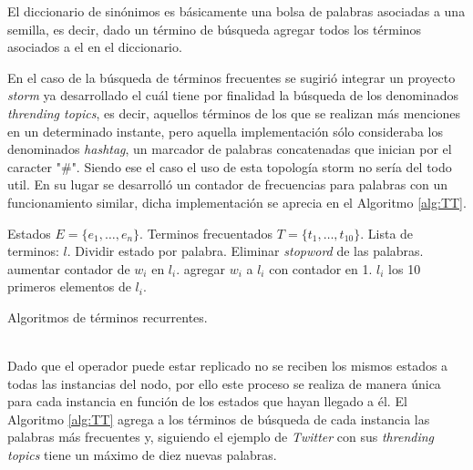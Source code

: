 El diccionario de sinónimos es básicamente una bolsa de palabras asociadas a una semilla, es decir, dado un término de búsqueda agregar todos los términos asociados a el en el diccionario.

En el caso de la búsqueda de términos frecuentes se sugirió integrar un proyecto \textit{storm} ya desarrollado el cuál tiene por finalidad la búsqueda de los denominados \textit{thrending topics}, es decir, aquellos términos de los que se realizan más menciones en un determinado instante, pero aquella implementación sólo consideraba los denominados \textit{hashtag}, un marcador de palabras concatenadas que inician por el caracter "\#". Siendo ese el caso el uso de esta topología storm no sería del todo util. En su lugar se desarrolló un contador de frecuencias para palabras con un funcionamiento similar, dicha implementación se aprecia en el Algoritmo \ref{alg:TT}.\\

\begin{algorithm}[H]
	\begin{algorithmic}
		\REQUIRE Estados $E=\{e_{1}, \dots, e_{n} \}$.
		\ENSURE Terminos frecuentados $T=\{t_{1}, \dots, t_{10} \}$.
		\STATE Lista de terminos: $l$.
			\STATE Dividir estado por palabra.
			\STATE Eliminar \textit{stopword} de las palabras.
					\STATE aumentar contador de $w_{i}$ en $l_{i}$.
				\ELSE
					\STATE agregar $w_{i}$ a $l_{i}$ con contador en 1.
				\ENDIF		
			\ENDFOR
		\ENDFOR
			\RETURN $l_{i}$
		\ELSE
			\RETURN los 10 primeros elementos de $l_{i}$.
		\ENDIF
	\end{algorithmic}
	\caption{Algoritmos de términos recurrentes.}
	\label{alg:TT}
\end{algorithm}\vphantom\\

Dado que el operador puede estar replicado no se reciben los mismos estados a todas las instancias del nodo, por ello este proceso se realiza de manera única para cada instancia en función de los estados que hayan llegado a él. El Algoritmo \ref{alg:TT} agrega a los términos de búsqueda de cada instancia las palabras más frecuentes y, siguiendo el ejemplo de \textit{Twitter} con sus \textit{thrending topics} tiene un máximo de diez nuevas palabras.

